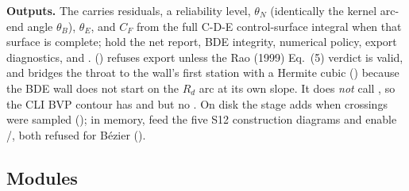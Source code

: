 \textbf{Outputs.} The  carries residuals, a reliability level, $\theta_N$ (identically the
kernel arc-end angle $\theta_B$), $\theta_E$, and $C_F$ from the full C-D-E control-surface integral when that
surface is complete;  hold the net report, BDE integrity, numerical policy,
export diagnostics,  and .
 () refuses export unless the Rao (1999) Eq.~(5) verdict is valid,
and bridges the throat to the wall's first station with a Hermite cubic () because the BDE
wall does not start on the $R_d$ arc at its own slope. It does \emph{not} call
, so the CLI BVP contour has  and
 but no . On disk the stage adds
 when crossings were sampled (); in memory,
 feed the five S12 construction diagrams and enable /, both
refused for B\'ezier ().

\subsection{Modules}

